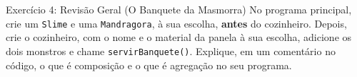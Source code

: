 \begin{exercicio}{Exercício 4: Revisão Geral (O Banquete da Masmorra)}
No programa principal, crie um \texttt{Slime} e uma \texttt{Mandragora}, à sua escolha,
\textbf{antes} do cozinheiro. Depois, crie o cozinheiro, com o nome e o material da panela à sua
escolha, adicione os dois monstros e chame \texttt{servirBanquete()}. Explique, em um comentário
no código, o que é composição e o que é agregação no seu programa.
\end{exercicio}
